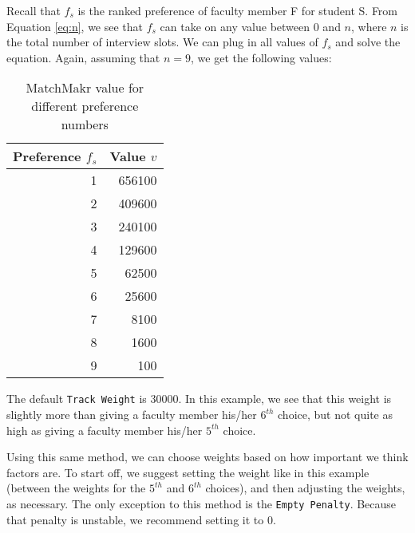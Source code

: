 Recall that $f_s$ is the ranked preference of faculty member F for student S.  From Equation \ref{eq:n}, we see that $f_s$ can take on any value between 0 and $n$, where $n$ is the total number of interview slots.  We can plug in all values of $f_s$ and solve the equation.  Again, assuming that $n=9$, we get the following values:

\begin{table}[h!]
	\centering
	\begin{tabular}{| r | r|}
		\hline
		\textbf{Preference $f_s$} & \textbf{Value $v$} \\ \hline \hline
		
		1 & 656100 \\ 
		2 & 409600 \\ 
		3 & 240100 \\ 
		4 & 129600 \\ 
		5 & 62500 \\ 
		6 & 25600 \\ 
		7 & 8100 \\ 
		8 & 1600 \\ 
		9 & 100 \\ \hline
		
	\end{tabular}
	\caption{\label{tab:values} MatchMakr value for different preference numbers}
\end{table}

The default \texttt{Track Weight} is 30000.  In this example, we see that this weight is slightly more than giving a faculty member his/her $6^{th}$ choice, but not quite as high as giving a faculty member his/her $5^{th}$ choice.

Using this same method, we can choose weights based on how important we think factors are.  To start off, we suggest setting the weight like in this example (between the weights for the $5^{th}$ and $6^{th}$ choices), and then adjusting the weights, as necessary.  The only exception to this method is the \texttt{Empty Penalty}.  Because that penalty is unstable, we recommend setting it to 0.
























































